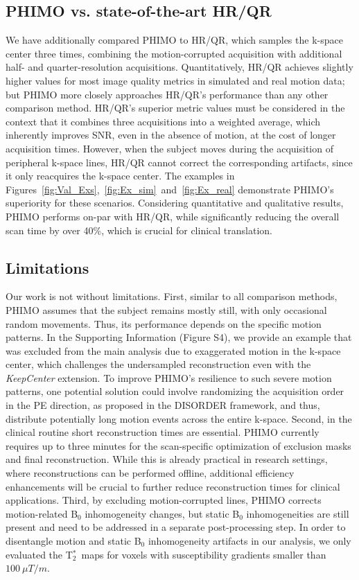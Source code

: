 \documentclass[AMA,STIX2COL]{MRM}
\newcommand{\tstar}[1]{{T$_2^*$}}
\begin{document}
\subsection{PHIMO vs. state-of-the-art HR/QR}
We have additionally compared PHIMO to HR/QR, which samples the k-space center three times, combining the motion-corrupted acquisition with additional half- and quarter-resolution acquisitions. 
Quantitatively, HR/QR achieves slightly higher values for most image quality metrics in simulated and real motion data; but PHIMO more closely approaches HR/QR's performance than any other comparison method. 
HR/QR's superior metric values must be considered in the context that it combines three acquisitions into a weighted average, which inherently improves SNR, even in the absence of motion, at the cost of longer acquisition times.
However, when the subject moves during the acquisition of peripheral k-space lines, HR/QR cannot correct the corresponding artifacts, since it only reacquires the k-space center. The examples in Figures~\ref{fig:Val_Exs},~\ref{fig:Ex_sim}~and~\ref{fig:Ex_real} demonstrate PHIMO's superiority for these scenarios.
Considering quantitative and qualitative results, PHIMO performs on-par with HR/QR, while significantly reducing the overall scan time by over 40\%, which is crucial for clinical translation. 


\subsection{Limitations}
Our work is not without limitations. 
First, similar to all comparison methods, PHIMO assumes that the subject remains mostly still, with only occasional random movements. Thus, its performance depends on the specific motion patterns. In the Supporting Information (Figure S4), we provide an example that was excluded from the main analysis due to exaggerated motion in the k-space center, which challenges the undersampled reconstruction even with the \textit{KeepCenter} extension.
To improve PHIMO’s resilience to such severe motion patterns, one potential solution could involve randomizing the acquisition order in the PE direction, as proposed in the DISORDER framework,\cite{CorderoGrande_2020} and thus, distribute potentially long motion events across the entire k-space. 
Second, in the clinical routine short reconstruction times are essential. PHIMO currently requires up to three minutes for the scan-specific optimization of exclusion masks and final reconstruction. While this is already practical in research settings, where reconstructions can be performed offline, additional efficiency enhancements will be crucial to further reduce reconstruction times for clinical applications.
Third, by excluding motion-corrupted lines, PHIMO corrects motion-related B$_0$ inhomogeneity changes, but static B$_0$ inhomogeneities are still present and need to be addressed in a separate post-processing step.\cite{Hirsch_2013} In order to disentangle motion and static B$_0$ inhomogeneity artifacts in our analysis, we only evaluated the \tstar{}~maps for voxels with susceptibility gradients smaller than~$100~\mu T/m$.
\end{document}
